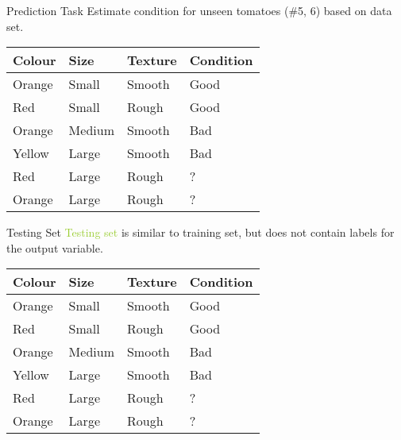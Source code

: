 \documentclass[usenames,dvipsnames]{beamer}
\begin{document}
\begin{frame}{Prediction Task}
Estimate condition for unseen tomatoes (\#5, 6) based on data set. 

\begin{table}[]
	\begin{tabular}{|l|l|l||l|}
		\hline 
		
		\textbf{Colour} & \textbf{Size} & \textbf{Texture} & \textbf{Condition} \\ \hline 
		Orange & Small & Smooth  & Good      \\
		Red    & Small  & Rough  & Good \\
		Orange & Medium & Smooth & Bad \\
		Yellow & Large  & Smooth & Bad \\ \hline
		Red    & Large  & Rough  & ? \\
		Orange &  Large & Rough  & ? \\ \hline          
	\end{tabular}
\end{table}
\end{frame}

\begin{frame}{Testing Set}
\textcolor{YellowGreen}{Testing set} is similar to \textcolor{Peach}{training set}, but does not contain labels for the output variable. 

\begin{table}[]
	\begin{tabular}{|l|l|l||l|}
		\hline 
		\textbf{Colour} & \textbf{Size} & \textbf{Texture} & \textbf{Condition} \\ \hline 
		\rowcolor{Peach}
		Orange & Small & Smooth  & Good      \\
		\rowcolor{Peach}
		Red    & Small  & Rough  & Good \\
		\rowcolor{Peach}
		Orange & Medium & Smooth & Bad \\
		\rowcolor{Peach}
		Yellow & Large  & Smooth & Bad \\ \hline
				\rowcolor{YellowGreen}
		Red    & Large  & Rough  & ? \\
		\rowcolor{YellowGreen}
		Orange &  Large & Rough  & ? \\ \hline          
	\end{tabular}
\end{table}
\end{frame}
\end{document}

